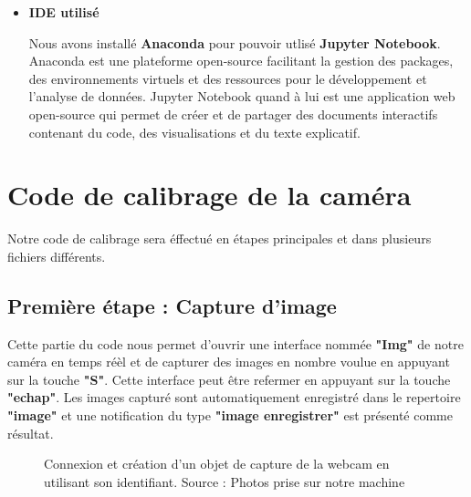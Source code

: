 \begin{itemize}[label={\Huge$\star$}]
 \item \textbf{IDE utilisé}	
  			
  			Nous avons installé \textbf{Anaconda}  pour pouvoir utlisé \textbf{Jupyter Notebook}. Anaconda est une plateforme open-source facilitant la gestion des packages, des environnements virtuels et des ressources pour le développement et l'analyse de données.
  			Jupyter Notebook quand à lui est une application web open-source qui permet de créer et de partager des documents interactifs contenant du code, des visualisations et du texte explicatif.
\end{itemize}
 
 
 \newpage
\section{Code de calibrage de la caméra}
 Notre code de calibrage sera éffectué en  étapes principales et dans plusieurs fichiers différents.
 
  \subsection{Première étape : Capture d'image}
 		
 	Cette partie du code nous permet d'ouvrir une interface nommée \textbf{"Img"} de notre caméra en temps réèl et de capturer des images en nombre voulue en appuyant sur la touche \textbf{"S"}. Cette interface peut être refermer en appuyant sur la touche \textbf{"echap"}. Les images capturé sont automatiquement enregistré dans le repertoire \textbf{"image"} et une notification du type \textbf{"image enregistrer"} est présenté comme résultat.
 	
 	\begin{figure}[H]%
 		\center%
 		\setlength{\fboxsep}{5pt}%
 		\setlength{\fboxrule}{0.5pt}%
 		\caption[Code de capture d'image (partie 1)]{Connexion et création d'un objet de capture de la webcam en utilisant son identifiant. Source : Photos prise sur notre machine}%
 		\label{fig:Code de capture d'image(partie 1)}
 	\end{figure}
 	

